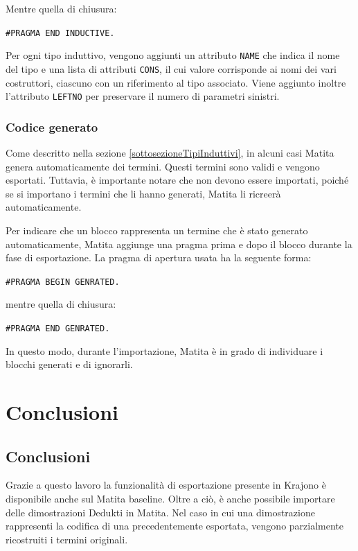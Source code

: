\documentclass[12pt,a4paper]{mimosis}
\begin{document}
Mentre quella di chiusura:
\begin{center}
  \texttt{\#PRAGMA END INDUCTIVE.}
\end{center}

Per ogni tipo induttivo, vengono aggiunti un attributo \texttt{NAME} che indica 
il nome del tipo e una lista di attributi \texttt{CONS}, il cui valore corrisponde
ai nomi dei vari costruttori, ciascuno con un riferimento al tipo associato.
Viene aggiunto inoltre l'attributo \texttt{LEFTNO} per preservare il numero di
parametri sinistri.

\subsection{Codice generato}
Come descritto nella sezione \ref{sottosezioneTipiInduttivi}, in alcuni casi
Matita genera automaticamente dei termini. Questi termini sono validi e vengono
esportati. Tuttavia, è importante notare che non devono essere importati, poiché
se si importano i termini che li hanno generati, Matita li ricreerà 
automaticamente.

Per indicare che un blocco rappresenta un termine che è stato generato automaticamente,
Matita aggiunge una pragma prima e dopo il blocco durante la fase di esportazione.
La pragma di apertura usata ha la seguente forma:
\begin{center}
  \texttt{\#PRAGMA BEGIN GENRATED.}
\end{center}

mentre quella di chiusura:
\begin{center}
  \texttt{\#PRAGMA END GENRATED.}
\end{center}

In questo modo, durante l'importazione, Matita è in grado di individuare i
blocchi generati e di ignorarli.


\chapter{Conclusioni}
\section{Conclusioni}
Grazie a questo lavoro la funzionalità di esportazione presente in Krajono
è disponibile anche sul Matita baseline. Oltre a ciò, è anche possibile
importare delle dimostrazioni Dedukti in Matita. Nel caso in cui una dimostrazione
rappresenti la codifica di una precedentemente esportata, vengono parzialmente
ricostruiti i termini originali.
\end{document}
